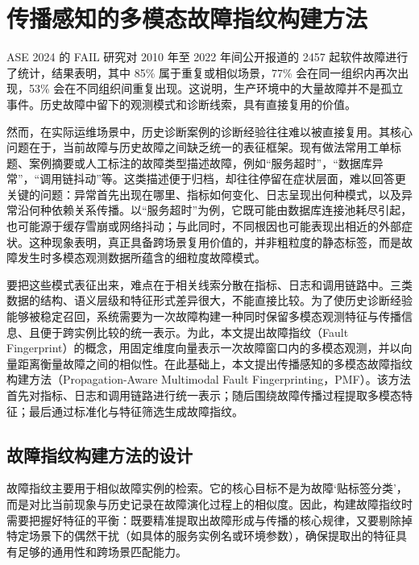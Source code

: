 
\section{传播感知的多模态故障指纹构建方法}

ASE 2024 的 FAIL 研究对 2010 年至 2022 年间公开报道的 2457 起软件故障进行了统计，结果表明，其中 85\% 属于重复或相似场景，77\% 会在同一组织内再次出现，53\% 会在不同组织间重复出现\cite{fail-anandayuvaraj2024}。这说明，生产环境中的大量故障并不是孤立事件。历史故障中留下的观测模式和诊断线索，具有直接复用的价值。

然而，在实际运维场景中，历史诊断案例的诊断经验往往难以被直接复用。其核心问题在于，当前故障与历史故障之间缺乏统一的表征框架。现有做法常用工单标题、案例摘要或人工标注的故障类型描述故障，例如“服务超时”，“数据库异常”，“调用链抖动”等。这类描述便于归档，却往往停留在症状层面，难以回答更关键的问题：异常首先出现在哪里、指标如何变化、日志呈现出何种模式，以及异常沿何种依赖关系传播。以“服务超时”为例，它既可能由数据库连接池耗尽引起，也可能源于缓存雪崩或网络抖动；与此同时，不同根因也可能表现出相近的外部症状。这种现象表明，真正具备跨场景复用价值的，并非粗粒度的静态标签，而是故障发生时多模态观测数据所蕴含的细粒度故障模式。

要把这些模式表征出来，难点在于相关线索分散在指标、日志和调用链路中。三类数据的结构、语义层级和特征形式差异很大，不能直接比较。为了使历史诊断经验能够被稳定召回，系统需要为一次故障构建一种同时保留多模态观测特征与传播信息、且便于跨实例比较的统一表示。为此，本文提出故障指纹（Fault Fingerprint）的概念，用固定维度向量表示一次故障窗口内的多模态观测，并以向量距离衡量故障之间的相似性。在此基础上，本文提出传播感知的多模态故障指纹构建方法（Propagation-Aware Multimodal Fault Fingerprinting，PMF）。该方法首先对指标、日志和调用链路进行统一表示；随后围绕故障传播过程提取多模态特征；最后通过标准化与特征筛选生成故障指纹。

\subsection{故障指纹构建方法的设计}

故障指纹主要用于相似故障实例的检索。它的核心目标不是为故障‘贴标签分类’，而是对比当前现象与历史记录在故障演化过程上的相似度。因此，构建故障指纹时需要把握好特征的平衡：既要精准提取出故障形成与传播的核心规律，又要剔除掉特定场景下的偶然干扰（如具体的服务实例名或环境参数），确保提取出的特征具有足够的通用性和跨场景匹配能力。

